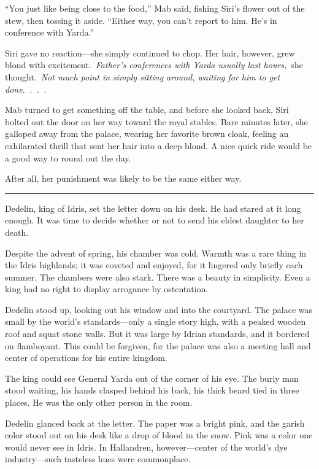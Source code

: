 “You just like being close to the food,” Mab said, fishing Siri’s flower out of the stew, then tossing it aside. “Either way, you can’t report to him. He’s in conference with Yarda.”

Siri gave no reaction—she simply continued to chop. Her hair, however, grew blond with excitement.~\textit{Father’s conferences with Yarda usually last hours,}~she thought.~\textit{Not much point in simply sitting around, waiting for him to get done.~.~.~.}

Mab turned to get something off the table, and before she looked back, Siri bolted out the door on her way toward the royal stables. Bare minutes later, she galloped away from the palace, wearing her favorite brown cloak, feeling an exhilarated thrill that sent her hair into a deep blond. A nice quick ride would be a good way to round out the day.

After all, her punishment was likely to be the same either way.

\bigskip \hrule \bigskip

Dedelin, king of Idris, set the letter down on his desk. He had stared at it long enough. It was time to decide whether or not to send his eldest daughter to her death.

Despite the advent of spring, his chamber was cold. Warmth was a rare thing in the Idris highlands; it was coveted and enjoyed, for it lingered only briefly each summer. The chambers were also stark. There was a beauty in simplicity. Even a king had no right to display arrogance by ostentation.

Dedelin stood up, looking out his window and into the courtyard. The palace was small by the world’s standards—only a single story high, with a peaked wooden roof and squat stone walls. But it was large by Idrian standards, and it bordered on flamboyant. This could be forgiven, for the palace was also a meeting hall and center of operations for his entire kingdom.

The king could see General Yarda out of the corner of his eye. The burly man stood waiting, his hands clasped behind his back, his thick beard tied in three places. He was the only other person in the room.

Dedelin glanced back at the letter. The paper was a bright pink, and the garish color stood out on his desk like a drop of blood in the snow. Pink was a color one would never see in Idris. In Hallandren, however—center of the world’s dye industry—such tasteless hues were commonplace.

